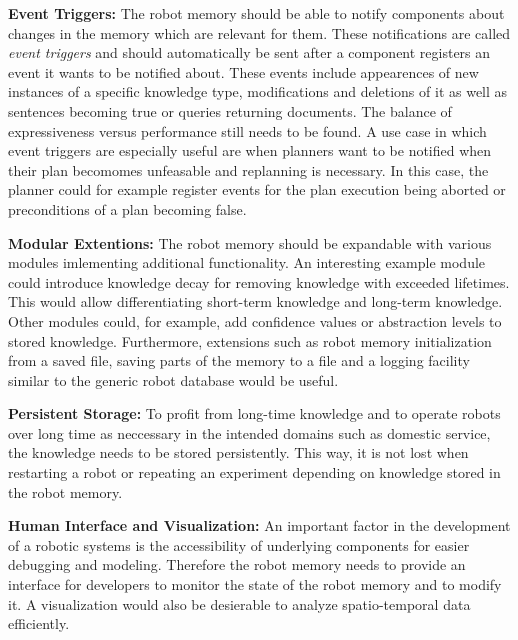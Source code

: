 \documentclass[a4paper,11pt]{article}
\begin{document}
\smallskip
\textbf{Event Triggers:} The robot memory should be able to notify
components about changes in the memory which are relevant for
them. These notifications are called \emph{event triggers} and should
automatically be sent after a component registers an event it wants to
be notified about. These events include appearences of new instances
of a specific knowledge type, modifications and deletions of it as
well as sentences becoming true or queries returning documents. The
balance of expressiveness versus performance still needs to be
found. A use case in which event triggers are especially useful are
when planners want to be notified when their plan becomomes unfeasable
and replanning is necessary. In this case, the planner could for
example register events for the plan execution being aborted or
preconditions of a plan becoming false.

\smallskip
\textbf{Modular Extentions:} The robot memory should be expandable
with various modules imlementing additional functionality. An
interesting example module could introduce knowledge decay for
removing knowledge with exceeded lifetimes. This would allow
differentiating short-term knowledge and long-term knowledge. Other
modules could, for example, add confidence values or abstraction
levels to stored knowledge. Furthermore, extensions such as robot
memory initialization from a saved file, saving parts of the memory to
a file and a logging facility similar to the generic robot database
would be useful.


\smallskip
\textbf{Persistent Storage:} To profit from long-time knowledge and to
operate robots over long time as neccessary in the intended domains
such as domestic service, the knowledge needs to be stored
persistently. This way, it is not lost when restarting a robot or
repeating an experiment depending on knowledge stored in the robot
memory.

\smallskip
\textbf{Human Interface and Visualization:} An important factor in the
development of a robotic systems is the accessibility of underlying
components for easier debugging and modeling. Therefore the robot
memory needs to provide an interface for developers to monitor the
state of the robot memory and to modify it. A visualization would also
be desierable to analyze spatio-temporal data efficiently.
\end{document}
